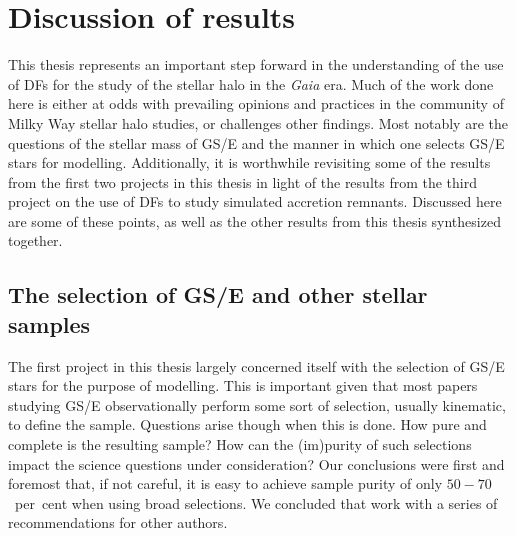 \section{Discussion of results}

This thesis represents an important step forward in the understanding of the use of DFs for the study of the stellar halo in the \textit{Gaia} era. Much of the work done here is either at odds with prevailing opinions and practices in the community of Milky Way stellar halo studies, or challenges other findings. Most notably are the questions of the stellar mass of GS/E and the manner in which one selects GS/E stars for modelling. Additionally, it is worthwhile revisiting some of the results from the first two projects in this thesis in light of the results from the third project on the use of DFs to study simulated accretion remnants. Discussed here are some of these points, as well as the other results from this thesis synthesized together.

\subsection{The selection of GS/E and other stellar samples}

The first project in this thesis largely concerned itself with the selection of GS/E stars for the purpose of modelling. This is important given that most papers studying GS/E observationally perform some sort of selection, usually kinematic, to define the sample. Questions arise though when this is done. How pure and complete is the resulting sample? How can the (im)purity of such selections impact the science questions under consideration? Our conclusions were first and foremost that, if not careful, it is easy to achieve sample purity of only $50-70$~per~cent when using broad selections. We concluded that work with a series of recommendations for other authors.

